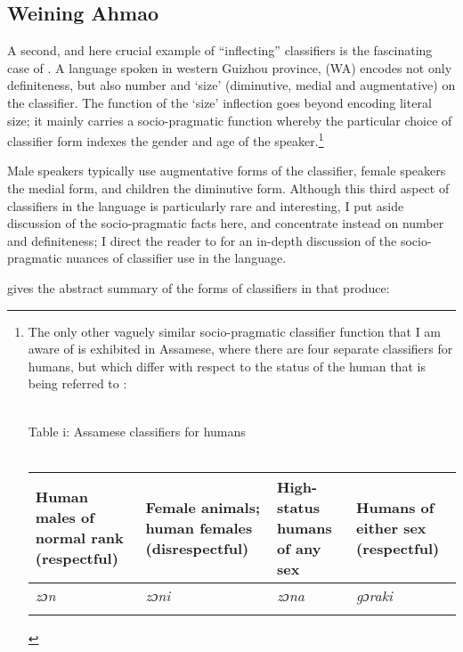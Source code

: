 \documentclass[output=paper
,modfonts
,nonflat]{langsci/langscibook}
\begin{document}
\subsection{Weining Ahmao} \label{sec:hall:4.2}

A second, and here crucial example of ``inflecting'' classifiers is the fascinating case of  \citep{GernerBisang2008,GernerBisang2010}. A  language spoken in western Guizhou province,  (WA) encodes not only definiteness, but also number and `size' (diminutive, medial and augmentative) on the classifier. The function of the `size' inflection goes beyond encoding literal size; it mainly carries a socio-pragmatic function whereby the particular choice of classifier form indexes the gender and age of the speaker.\footnote{The only other vaguely similar socio-pragmatic classifier function that I am aware of is exhibited in Assamese, where there are four separate classifiers for humans, but which differ with respect to the status of the human that is being referred to \citep[102--103]{Aikhenvald2000}:

{\centering 
~\\	
Table i: Assamese classifiers for humans\\ ~ \\
\begin{tabularx}{0.96\textwidth}{QQQQ}
\lsptoprule
{\scriptsize Human males of normal rank (respectful)} & {\scriptsize Female animals; human females (disrespectful)} & {\scriptsize High-status humans of any sex} &{\scriptsize Humans of either sex (respectful)}\\
\midrule
\textit{zɔn}&\textit{zɔni}&\textit{zɔna}&\textit{gɔraki}\\
\lspbottomrule
\end{tabularx}}
}

Male speakers typically use augmentative forms of the classifier, female speakers the medial form, and children the diminutive form. Although this third aspect of classifiers in the language is particularly rare and interesting, I put aside discussion of the socio-pragmatic facts here, and concentrate instead on number and definiteness; I direct the reader to \citet{GernerBisang2008,GernerBisang2010} for an in-depth discussion of the socio-pragmatic nuances of classifier use in the language.

 gives the abstract summary of the forms of classifiers in  that \citet[721]{GernerBisang2008} produce:
\end{document}
